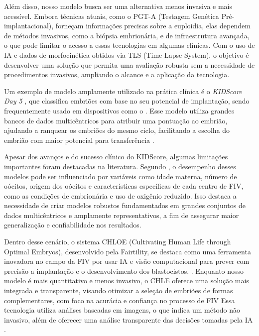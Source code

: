 Além disso, nosso modelo busca ser uma alternativa menos invasiva e mais acessível. Embora técnicas atuais, como o PGT-A (Testagem Genética Pré-implantacional), forneçam informações precisas sobre a euploidia, elas dependem de métodos invasivos, como a biópsia embrionária, e de infraestrutura avançada, o que pode limitar o acesso a essas tecnologias em algumas clínicas. Com o uso de IA e dados de morfocinética obtidos via TLS (Time-Lapse System), o objetivo é desenvolver uma solução que permita uma avaliação robusta sem a necessidade de procedimentos invasivos, ampliando o alcance e a aplicação da tecnologia.

Um exemplo de modelo amplamente utilizado na prática clínica é o \textit{KIDScore\texttrademark{} Day 5} , que classifica embriões com base no seu potencial de implantação, sendo frequentemente usado em dispositivos como o \texttrademark{}\cite{reignier2019}. Esse modelo utiliza grandes bancos de dados multicêntricos para atribuir uma pontuação ao embrião, ajudando a ranquear os embriões do mesmo ciclo, facilitando a escolha do embrião com maior potencial para transferência \cite{reignier2019}.

Apesar dos avanços e do sucesso clínico do KIDScore\texttrademark{}, algumas limitações importantes foram destacadas na literatura. Segundo , o desempenho desses modelos pode ser influenciado por variáveis como idade materna, número de oócitos, origem dos oócitos e características específicas de cada centro de FIV, como as condições de  embrionária e uso de oxigênio reduzido. Isso destaca a necessidade de criar modelos robustos fundamentados em grandes conjuntos de dados multicêntricos e amplamente representativos, a fim de assegurar maior generalização e confiabilidade nos resultados.

Dentro desse cenário, o sistema CHLOE\texttrademark{} (Cultivating Human Life through Optimal Embryos), desenvolvido pela Fairtility\texttrademark{}, se destaca como uma ferramenta inovadora no campo da FIV por usar IA e visão computacional para prever com precisão a implantação e o desenvolvimento dos blastocistos. \cite{chole}. Enquanto nosso modelo é mais quantitativo e menos invasivo, o CHLE oferece uma solução mais integrada e transparente, visando otimizar a seleção de embriões de formas complementares, com foco na acurácia e confiança no processo de FIV  Essa tecnologia utiliza análises baseadas em imagens, o que indica um método não invasivo, além de oferecer uma análise transparente das decisões tomadas pela IA \cite{chole}.

